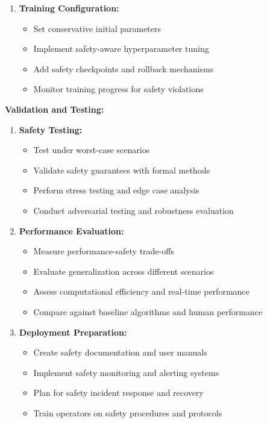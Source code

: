 \documentclass[12pt]{article}
\begin{document}
{{{{\begin{enumerate}
\item \textbf{Training Configuration:}
   \begin{itemize}
   \item Set conservative initial parameters
   \item Implement safety-aware hyperparameter tuning
   \item Add safety checkpoints and rollback mechanisms
   \item Monitor training progress for safety violations
   \end{itemize}
\end{enumerate}

\textbf{Validation and Testing:}
\begin{enumerate}
\item \textbf{Safety Testing:}
   \begin{itemize}
   \item Test under worst-case scenarios
   \item Validate safety guarantees with formal methods
   \item Perform stress testing and edge case analysis
   \item Conduct adversarial testing and robustness evaluation
   \end{itemize}

\item \textbf{Performance Evaluation:}
   \begin{itemize}
   \item Measure performance-safety trade-offs
   \item Evaluate generalization across different scenarios
   \item Assess computational efficiency and real-time performance
   \item Compare against baseline algorithms and human performance
   \end{itemize}

\item \textbf{Deployment Preparation:}
   \begin{itemize}
   \item Create safety documentation and user manuals
   \item Implement safety monitoring and alerting systems
   \item Plan for safety incident response and recovery
   \item Train operators on safety procedures and protocols
   \end{itemize}
\end{enumerate}

}}}}
\end{document}
